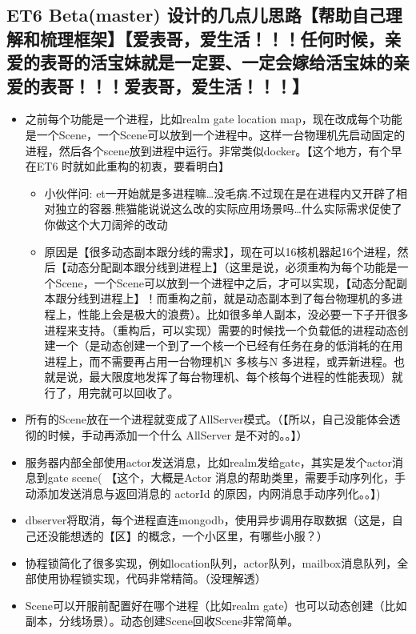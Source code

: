 \documentclass[9pt, b5paper]{article}
\begin{document}
\subsection{ET6 Beta(master) 设计的几点儿思路【帮助自己理解和梳理框架】【爱表哥，爱生活！！！任何时候，亲爱的表哥的活宝妹就是一定要、一定会嫁给活宝妹的亲爱的表哥！！！爱表哥，爱生活！！！】}
\label{sec-11-1}
\begin{itemize}
\item 之前每个功能是一个进程，比如realm gate location map，现在改成每个功能是一个Scene，一个Scene可以放到一个进程中。这样一台物理机先启动固定的进程，然后各个scene放到进程中运行。非常类似docker。【这个地方，有个早在ET6 时就如此重构的初衷，要看明白】
\begin{itemize}
\item 小伙伴问: et一开始就是多进程嘛…没毛病.不过现在是在进程内又开辟了相对独立的容器.熊猫能说说这么改的实际应用场景吗…什么实际需求促使了你做这个大刀阔斧的改动
\item 原因是【很多动态副本跟分线的需求】，现在可以16核机器起16个进程，然后【动态分配副本跟分线到进程上】（这里是说，必须重构为每个功能是一个Scene，一个Scene可以放到一个进程中之后，才可以实现，【动态分配副本跟分线到进程上】！而重构之前，就是动态副本到了每台物理机的多进程上，性能上会是极大的浪费）。比如很多单人副本，没必要一下子开很多进程来支持。（重构后，可以实现）需要的时候找一个负载低的进程动态创建一个（是动态创建一个到了一个核一个已经有任务在身的低消耗的在用进程上，而不需要再占用一台物理机N 多核与N 多进程，或弄新进程。也就是说，最大限度地发挥了每台物理机、每个核每个进程的性能表现）就行了，用完就可以回收了。
\end{itemize}
\item 所有的Scene放在一个进程就变成了AllServer模式。（【所以，自己没能体会透彻的时候，手动再添加一个什么 AllServer 是不对的。。】）
\item 服务器内部全部使用actor发送消息，比如realm发给gate，其实是发个actor消息到gate scene( 【这个，大概是Actor 消息的帮助类里，需要手动序列化，手动添加发送消息与返回消息的 actorId 的原因，内网消息手动序列化。。】)
\item dbserver将取消，每个进程直连mongodb，使用异步调用存取数据（这是，自己还没能想透的【区】的概念，一个小区里，有哪些小服？）
\item 协程锁简化了很多实现，例如location队列，actor队列，mailbox消息队列，全部使用协程锁实现，代码非常精简。（没理解透）
\item Scene可以开服前配置好在哪个进程（比如realm gate）也可以动态创建（比如副本，分线场景）。动态创建Scene回收Scene非常简单。
\end{itemize}
\end{document}
